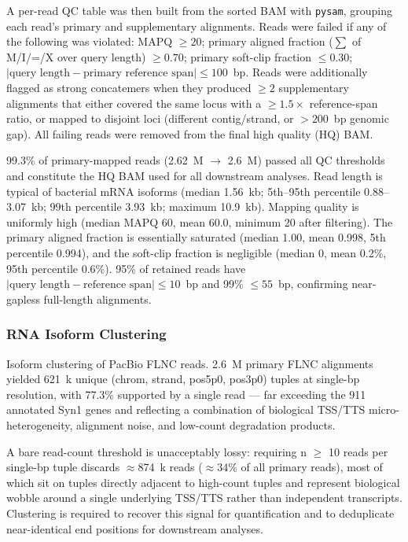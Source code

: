 A per-read QC table was then built from the sorted BAM with \texttt{pysam}, grouping each read's primary and supplementary alignments.
Reads were failed if any of the following was violated: MAPQ $\geq 20$; primary aligned fraction ($\sum$ of M/I/=/X over query length) $\geq 0.70$; primary soft-clip fraction $\leq 0.30$; $|\text{query length} - \text{primary reference span}| \leq 100$~bp.
Reads were additionally flagged as strong concatemers when they produced $\geq 2$ supplementary alignments that either covered the same locus with a $\geq 1.5\times$ reference-span ratio, or mapped to disjoint loci (different contig/strand, or $>200$~bp genomic gap).
All failing reads were removed from the final high quality (HQ) BAM.

99.3\% of primary-mapped reads (2.62~M $\rightarrow$ 2.6~M) passed all QC thresholds and constitute the HQ BAM used for all downstream analyses.
Read length is typical of bacterial mRNA isoforms (median 1.56~kb; 5th--95th percentile 0.88--3.07~kb; 99th percentile 3.93~kb; maximum 10.9~kb).
Mapping quality is uniformly high (median MAPQ 60, mean 60.0, minimum 20 after filtering).
The primary aligned fraction is essentially saturated (median 1.00, mean 0.998, 5th percentile 0.994), and the soft-clip fraction is negligible (median 0, mean 0.2\%, 95th percentile 0.6\%).
95\% of retained reads have $|\text{query length} - \text{reference span}| \leq 10$~bp and 99\% $\leq 55$~bp, confirming near-gapless full-length alignments.

\subsubsection{RNA Isoform Clustering}
\label{method:pacbio-clustering}
Isoform clustering of PacBio FLNC reads.
2.6~M primary FLNC alignments yielded 621~k unique (chrom, strand, pos5p0, pos3p0) tuples at single-bp resolution, with 77.3\% supported by a single read — far exceeding the 911 annotated Syn1 genes and reflecting a combination of biological TSS/TTS micro-heterogeneity, alignment noise, and low-count degradation products.                                 

A bare read-count threshold is unacceptably lossy: requiring n $\geq$ 10 reads per single-bp tuple discards $\approx$874~k reads ($\approx$34\% of all primary reads), most of which sit on tuples directly adjacent to high-count tuples and represent biological wobble around a single underlying TSS/TTS rather than independent transcripts.
Clustering is required to recover this signal for quantification and to deduplicate near-identical end positions for downstream analyses.

